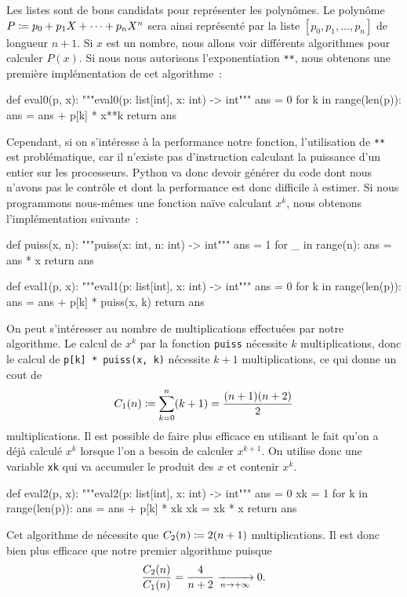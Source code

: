 \documentclass{magnolia}
\begin{document}
Les listes sont de bons candidats pour représenter les polynômes. Le polynôme 
$P\coloneqq p_0+p_1X+\cdots+p_n X^n$ sera ainsi représenté par la liste
$[p_0,p_1,\ldots,p_n]$ de longueur $n+1$. Si $x$ est un nombre, nous allons voir
différents algorithmes pour calculer $P(x)$. Si nous nous autorisons
l'exponentiation \verb!**!, nous obtenons une première
implémentation de cet algorithme~:
\begin{pythoncodeline}
def eval0(p, x):
    """eval0(p: list[int], x: int) -> int"""
    ans = 0
    for k in range(len(p)):
        ans = ans + p[k] * x**k
    return ans
\end{pythoncodeline}
Cependant, si on s'intéresse à la performance notre fonction, l'utilisation de \verb!**!
est problématique, car il n'existe pas d'instruction calculant la puissance d'un entier sur les
processeurs. Python va donc devoir générer du code dont nous n'avons pas le contrôle et dont
la performance est donc difficile à estimer. Si nous programmons nous-mêmes une
fonction naïve calculant $x^k$, nous obtenons l'implémentation suivante~:
\begin{pythoncodeline}
def puiss(x, n):
    """puiss(x: int, n: int) -> int"""
    ans = 1
    for _ in range(n):
        ans = ans * x
    return ans

def eval1(p, x):
    """eval1(p: list[int], x: int) -> int"""
    ans = 0
    for k in range(len(p)):
        ans = ans + p[k] * puiss(x, k)
    return ans
\end{pythoncodeline}
On peut s'intéresser au nombre de multiplications effectuées par notre algorithme. Le calcul
de $x^k$ par la fonction \verb!puiss! nécessite $k$ multiplications, donc le calcul de
\verb!p[k] * puiss(x, k)! nécessite $k+1$ multiplications, ce qui donne un cout de
\[C_1(n)\coloneqq \sum_{k=0}^n (k+1)=\frac{(n+1)(n+2)}{2}\]
multiplications. Il est possible de faire plus efficace en utilisant le fait qu'on a déjà calculé
$x^k$ lorsque l'on a besoin de calculer $x^{k+1}$. On utilise donc une variable \verb!xk! qui va accumuler le
produit des $x$ et contenir $x^k$.
\begin{pythoncodeline}
def eval2(p, x):
    """eval2(p: list[int], x: int) -> int"""
    ans = 0
    xk = 1
    for k in range(len(p)):
        ans = ans + p[k] * xk
        xk = xk * x
    return ans
\end{pythoncodeline}
Cet algorithme de nécessite que $C_2(n)\coloneqq 2(n+1)$ multiplications. Il est donc bien plus efficace
que notre premier algorithme puisque
\[\frac{C_2(n)}{C_1(n)}=\frac{4}{n+2}\xrightarrow[n\rightarrow +\infty]{}0.\]
\end{document}
